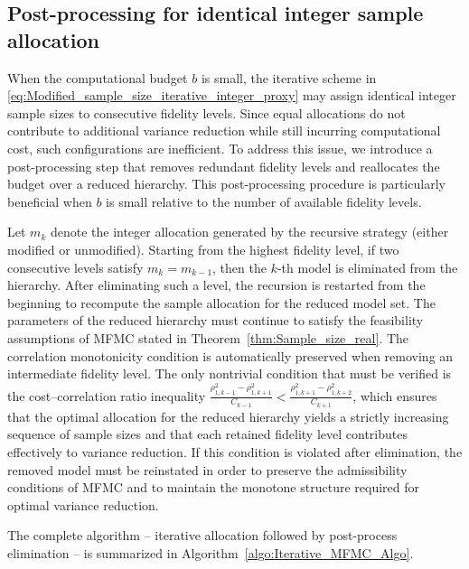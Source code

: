 \subsection{Post-processing for identical integer sample allocation}
When the computational budget $b$ is small, the iterative scheme in 
\eqref{eq:Modified_sample_size_iterative_integer_proxy}
may assign identical integer sample sizes to consecutive fidelity levels. 
Since equal allocations do not contribute to additional variance reduction 
while still incurring computational cost, such configurations are inefficient. To address this issue, we introduce a post-processing step that removes redundant fidelity levels and reallocates the budget over a reduced hierarchy. This post-processing procedure is particularly beneficial when $b$ is small relative to the number of available fidelity levels.

Let $m_k$ denote the integer allocation generated by the recursive 
strategy (either modified or unmodified). Starting from the highest fidelity level, if two consecutive levels satisfy $m_{k} = m_{k-1}$, then the $k$-th model is eliminated from the hierarchy. After eliminating such a level, the recursion is restarted from the beginning to recompute the sample allocation for the reduced model set. The parameters of the reduced hierarchy must continue to satisfy the feasibility assumptions of MFMC stated in Theorem~\ref{thm:Sample_size_real}. The correlation monotonicity condition is automatically preserved when removing an intermediate fidelity level. The only nontrivial condition that must be verified is the cost–correlation ratio inequality $\frac{\rho_{1,k-1}^2 - \rho_{1,k+1}^2}{C_{k-1}}<\frac{\rho_{1,k+1}^2 - \rho_{1,k+2}^2}{C_{k+1}}$, which ensures that the optimal allocation for the reduced hierarchy yields a 
strictly increasing sequence of sample sizes and that each retained fidelity level contributes effectively to variance reduction. If this condition is violated after elimination, the removed model must be reinstated in order to preserve the admissibility conditions of MFMC and to maintain the monotone structure required for optimal variance reduction.

The complete algorithm -- iterative allocation followed by post-process elimination -- is summarized in Algorithm~\ref{algo:Iterative_MFMC_Algo}.

  



